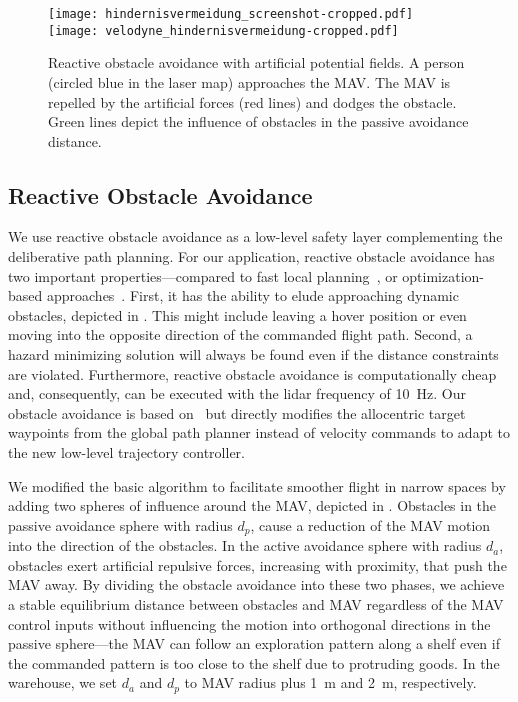 \begin{figure}[t]
  \setlength{\figureheight}{0.41\linewidth}
  \centering
  \texttt{[image: hindernisvermeidung\_screenshot-cropped.pdf]}~
  \texttt{[image: velodyne\_hindernisvermeidung-cropped.pdf]}%
  \vspace{-1ex}
  \caption{Reactive obstacle avoidance with artificial potential fields. A person (circled blue in the laser map) approaches the MAV. The MAV is repelled by the artificial forces (red lines) and dodges the obstacle. Green lines depict the influence of obstacles in the passive avoidance distance.}
  \label{fig:hindernisvermeidung_screenshot}
  \vspace{-2ex}
\end{figure}

\subsection{Reactive Obstacle Avoidance}
\label{sec:Reactive_Obstacle_Avoidance}
We use reactive obstacle avoidance as a low-level safety layer complementing the deliberative path planning.
For our application, reactive obstacle avoidance has two important properties---compared to fast local planning~\cite{3dvfh+}, or optimization-based approaches~\cite{Israelsen2014}.
First, it has the ability to elude approaching dynamic obstacles, depicted in . This might include leaving a hover position or even moving into the opposite direction of the commanded flight path.
Second, a hazard minimizing solution will always be found even if the distance constraints are violated.
Furthermore, reactive obstacle avoidance is computationally cheap and, consequently, can be executed with the lidar frequency of \SI{10}{\hertz}.
Our obstacle avoidance is based on~\cite{nieuwenhuisen2013isprs} but directly modifies the allocentric target waypoints from the global path planner instead of velocity commands to adapt to the new low-level trajectory controller.

We modified the basic algorithm to facilitate smoother flight in narrow spaces by adding two spheres of influence around the MAV, depicted in .
Obstacles in the passive avoidance sphere with radius $d_p$, cause a reduction of the MAV motion into the direction of the obstacles.
In the active avoidance sphere with radius $d_a$, obstacles exert artificial repulsive forces, increasing with proximity, that push the MAV away.
By dividing the obstacle avoidance into these two phases, we achieve a stable equilibrium distance between obstacles and MAV regardless of the MAV control inputs without influencing the motion into orthogonal directions in the passive sphere---\eg the MAV can follow an exploration pattern along a shelf even if the commanded pattern is too close to the shelf due to protruding goods.
In the warehouse, we set $d_a$ and $d_p$ to MAV radius plus \SI{1}{\meter} and \SI{2}{\meter}, respectively.

